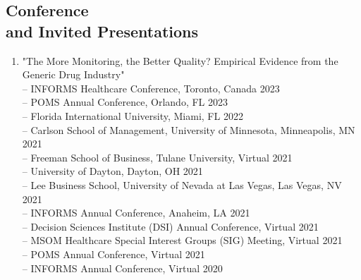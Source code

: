 \documentclass[margin,line]{resume}
\begin{document}
\begin{resume}
       
 	  \section{\mysidestyle Conference\\ and Invited Presentations} 
 	  
 	  \begin{enumerate}[topsep=0pt, leftmargin=*]
 	           
         \item "The More Monitoring, the Better Quality? Empirical Evidence from the Generic Drug Industry"\\[0.3em]
         -- INFORMS Healthcare Conference, Toronto, Canada \hfill   2023\\
  	     -- POMS Annual Conference, Orlando, FL \hfill   2023\\
               -- Florida International University, Miami, FL \hfill 2022\\
               -- Carlson School of Management, University of Minnesota, Minneapolis, MN \hfill 2021\\
               -- Freeman School of Business, Tulane University, Virtual \hfill 2021\\
               -- University of Dayton, Dayton, OH \hfill 2021\\
               -- Lee Business School, University of Nevada at Las Vegas, Las Vegas, NV \hfill 2021\\
               -- INFORMS Annual Conference, Anaheim, LA \hfill 2021\\
               -- Decision Sciences Institute (DSI) Annual Conference, Virtual \hfill 2021\\
               -- MSOM Healthcare Special Interest Groups (SIG) Meeting, Virtual \hfill2021\\
               -- POMS Annual Conference, Virtual \hfill2021\\
               -- INFORMS Annual Conference, Virtual \hfill2020\\


\end{enumerate}
\end{resume}
\end{document}
